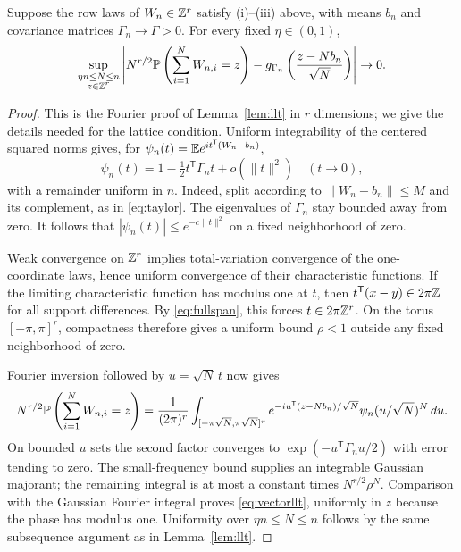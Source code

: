 \begin{lemma}\label{lem:vectorllt}
Suppose the row laws of $W_n\in\mathbb Z^r$ satisfy \textnormal{(i)--(iii)} above, with means $b_n$ and covariance matrices $\Gamma_n\to\Gamma>0$. For every fixed $\eta\in(0,1)$,
\begin{equation}\label{eq:vectorllt}
 \sup_{\substack{\eta n\le N\le n\\ z\in\mathbb Z^r}}
 \left|N^{r/2}\mathbb P\left(\sum_{i=1}^NW_{n,i}=z\right)
       -g_{\Gamma_n}\left(\frac{z-Nb_n}{\sqrt N}\right)\right|\to0.
\end{equation}
\end{lemma}
\begin{proof}
This is the Fourier proof of Lemma~\ref{lem:llt} in $r$ dimensions; we give the details needed for the lattice condition. Uniform integrability of the centered squared norms gives, for $\psi_n(t)=\mathbb E e^{it^{\mathsf T}(W_n-b_n)}$,
\[
 \psi_n(t)=1-\tfrac12t^{\mathsf T}\Gamma_nt+o(\|t\|^2)
 \quad(t\to0),
\]
with a remainder uniform in $n$. Indeed, split according to $\|W_n-b_n\|\le M$ and its complement, as in \eqref{eq:taylor}. The eigenvalues of $\Gamma_n$ stay bounded away from zero. It follows that $|\psi_n(t)|\le e^{-c\|t\|^2}$ on a fixed neighborhood of zero.

Weak convergence on $\mathbb Z^r$ implies total-variation convergence of the one-coordinate laws, hence uniform convergence of their characteristic functions. If the limiting characteristic function has modulus one at $t$, then $t^{\mathsf T}(x-y)\in2\pi\mathbb Z$ for all support differences. By \eqref{eq:fullspan}, this forces $t\in2\pi\mathbb Z^r$. On the torus $[-\pi,\pi]^r$, compactness therefore gives a uniform bound $\rho<1$ outside any fixed neighborhood of zero.

Fourier inversion followed by $u=\sqrt N\,t$ now gives
\[
 N^{r/2}\mathbb P\left(\sum_{i=1}^NW_{n,i}=z\right)
 =\frac1{(2\pi)^r}\int_{[-\pi\sqrt N,\pi\sqrt N]^r}
 e^{-iu^{\mathsf T}(z-Nb_n)/\sqrt N}\psi_n(u/\sqrt N)^N\,du.
\]
On bounded $u$ sets the second factor converges to
$\exp(-u^{\mathsf T}\Gamma_nu/2)$ with error tending to zero. The small-frequency bound supplies an integrable Gaussian majorant; the remaining integral is at most a constant times $N^{r/2}\rho^N$. Comparison with the Gaussian Fourier integral proves \eqref{eq:vectorllt}, uniformly in $z$ because the phase has modulus one. Uniformity over $\eta n\le N\le n$ follows by the same subsequence argument as in Lemma~\ref{lem:llt}.
\end{proof}

